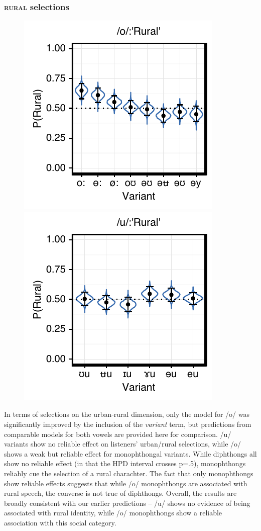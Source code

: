 \documentclass[PWPL]{article}
\begin{document}
\subsubsection{\textsc{rural} selections}
\begin{figure}[H]
\centering
\includegraphics[scale=0.8]{ow_local.pdf}
\includegraphics[scale=0.8]{uw_local.pdf}
\end{figure}
In terms of selections on the urban-rural dimension, only the model for /o/ was significantly improved by the inclusion of the \textit{variant} term, but predictions from comparable models for both vowels are provided here for comparison. /u/ variants show no reliable effect on listeners' urban/rural selections, while /o/ shows a weak but reliable effect for monophthongal variants. While diphthongs all show no reliable effect (in that the HPD interval crosses p=.5), monophthongs reliably cue the selection of a rural charachter. The fact that only monophthongs show reliable effects suggests that while /o/ monophthongs are associated with rural speech, the converse is not true of diphthongs. Overall, the results are broadly consistent with our earlier predictions -- /u/ shows no evidence of being associated with rural identity, while /o/ monophthongs show a reliable association with this social category.
\end{document}
